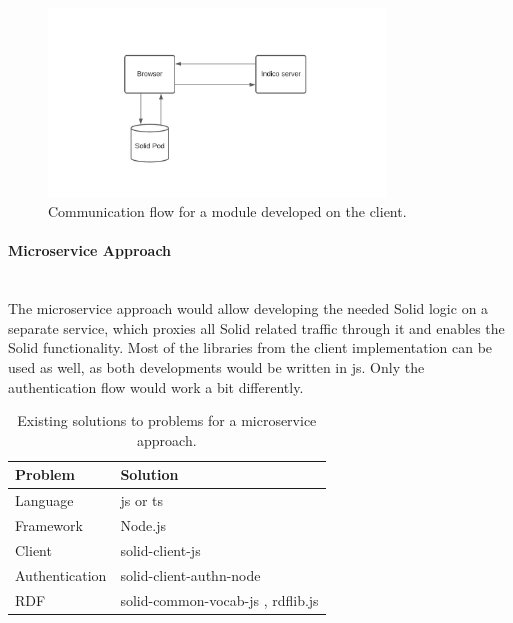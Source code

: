 \begin{figure}[H]
    \centering
    \includegraphics[width=0.8\textwidth]{prototype/graphs/poc-infrastructure-frontend.jpeg}
    \caption{Communication flow for a module developed on the client.}
    \label{fig:poc-infrastructure-frontend}
\end{figure}
\vspace{0.5cm}
\paragraph{Microservice Approach}\mbox{}\\

The microservice approach would allow developing the needed Solid logic on a separate service, which proxies all Solid related traffic through it and enables the Solid functionality. Most of the libraries from the client implementation can be used as well, as both developments would be written in \gls{js}. Only the authentication flow would work a bit differently.

\begin{table}[h!]
    \centering
    \begin{tabular}{| l | l |} 
    \hline
     Problem & Solution \\
     \hline
      Language & \gls{js} or \gls{ts}  \\
      Framework & Node.js  \\
      Client & solid-client-js \cite{solid-client-js}  \\
      Authentication & solid-client-authn-node \cite{solid-client-authn-node} \\
      RDF & solid-common-vocab-js \cite{solid-common-vocab-js}, rdflib.js \cite{rdflib.js}  \\
    \hline
    \end{tabular}
    \vspace{0.75cm}
    \caption{Existing solutions to problems for a microservice approach.}
    \label{table:2}
\end{table}

